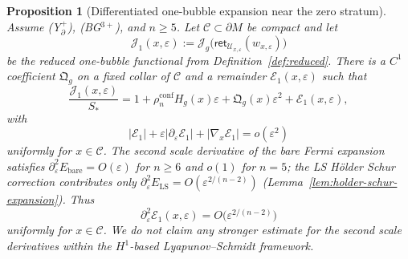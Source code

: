 \documentclass[11pt,reqno,a4paper]{amsart}
\numberwithin{equation}{section}
\theoremstyle{plain}
\newtheorem{proposition}[theorem]{Proposition}
\theoremstyle{remark}
\theoremstyle{plain}
\begin{document}
\begin{proposition}[Differentiated one-bubble expansion near the zero stratum]
\label{prop:onebubble-reduced-C2}
Assume \textup{(Y$^+_{\partial}$)}, \textup{(BG$^{3+}$)}, and $n\ge5$.
Let $\mathcal C\subset\partial M$ be compact and let
\[
\mathcal J_1(x,\varepsilon)
:=\mathcal J_g\bigl(\mathsf{ret}_{\mathcal U_{x,\varepsilon}}(w_{x,\varepsilon})\bigr)
\]
be the reduced one-bubble functional from Definition~\ref{def:reduced}.  There is a
$C^1$ coefficient $\mathfrak Q_g$ on a fixed collar of $\mathcal C$ and a remainder
$\mathcal E_1(x,\varepsilon)$ such that
\begin{equation}\label{eq:onebubble-full-Q-expansion}
\frac{\mathcal J_1(x,\varepsilon)}{S_\ast}
=
1+\rho_n^{\mathrm{conf}}H_g(x)\varepsilon
+\mathfrak Q_g(x)\varepsilon^2
+\mathcal E_1(x,\varepsilon),
\end{equation}
with
\begin{equation}\label{eq:onebubble-full-Q-remainder}
|\mathcal E_1|+\varepsilon|\partial_\varepsilon\mathcal E_1|
+|\nabla_x\mathcal E_1|=o(\varepsilon^2)
\end{equation}
uniformly for $x\in\mathcal C$.
The second scale derivative of the bare Fermi expansion satisfies
$\partial_\varepsilon^2 E_{\mathrm{bare}}=O(\varepsilon)$ for $n\ge6$
and $o(1)$ for $n=5$; the LS H\"older Schur correction contributes only
$\partial_\varepsilon^2 E_{\mathrm{LS}}=O(\varepsilon^{2/(n-2)})$
(Lemma~\ref{lem:holder-schur-expansion}).  Thus
\[
\partial_\varepsilon^2\mathcal E_1(x,\varepsilon)
=
O\bigl(\varepsilon^{2/(n-2)}\bigr)
\]
uniformly for $x\in\mathcal C$.  We do not claim any stronger estimate for the second scale derivatives within the $H^1$-based Lyapunov--Schmidt framework.


\end{proposition}
\end{document}
